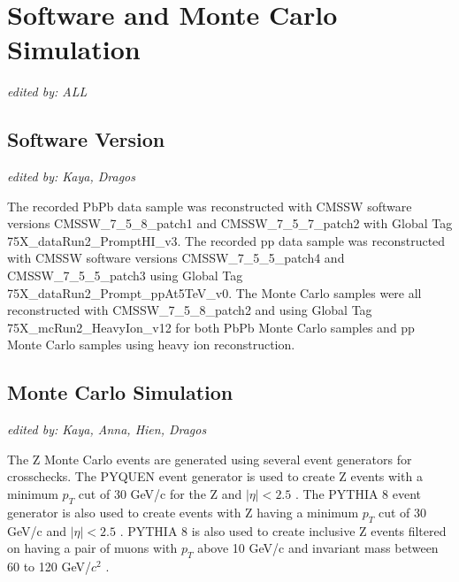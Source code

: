 \section{Software and Monte Carlo Simulation}
{\it edited by: ALL}

\subsection{Software Version}
{\it edited by: Kaya, Dragos}

The recorded PbPb data sample was reconstructed with CMSSW software versions CMSSW\_7\_5\_8\_patch1 and CMSSW\_7\_5\_7\_patch2 with Global Tag 75X\_dataRun2\_PromptHI\_v3. The recorded pp data sample was reconstructed with CMSSW software versions CMSSW_7_5_5_patch4 and CMSSW_7_5_5_patch3 using Global Tag 75X\_dataRun2\_Prompt\_ppAt5TeV\_v0. The Monte Carlo samples were all reconstructed with CMSSW\_7\_5\_8\_patch2 and using Global Tag 75X\_mcRun2\_HeavyIon\_v12 for both PbPb Monte Carlo samples and pp Monte Carlo samples using heavy ion reconstruction. 

\subsection{Monte Carlo Simulation}
{\it edited by: Kaya, Anna, Hien, Dragos}

The Z Monte Carlo events are generated using several event generators for crosschecks. The PYQUEN event generator is used to create Z events with a minimum $p_{T}$ cut of 30 GeV/c for the Z and $|\eta|<2.5$ . The PYTHIA 8 event generator is also used to create events with Z having a minimum $p_{T}$ cut of 30 GeV/c and $|\eta|<2.5$ . PYTHIA 8 is also used to create inclusive Z events filtered on having a pair of muons with $p_{T}$ above 10 GeV/c and invariant mass between 60 to 120 GeV/$c^2$ .


